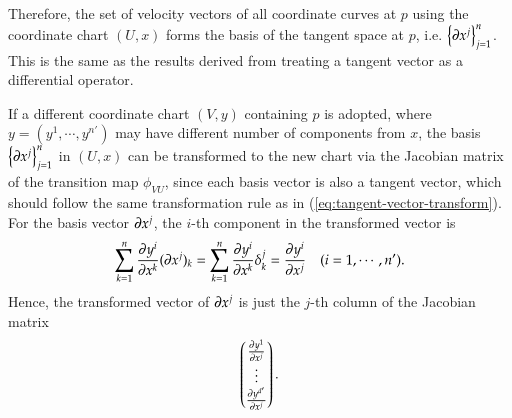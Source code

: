 \documentclass[11pt, a4paper]{book}
\begin{document}
Therefore, the set of velocity vectors of all coordinate curves at $p$ using the
coordinate chart $(U,x)$ forms the basis of the tangent space at $p$, i.e.
$\left\{ \boldsymbol{\partial} x^j \right\}_{j=1}^n$. This is the same as the results derived from
treating a tangent vector as a differential operator.

If a different coordinate chart $(V,y)$ containing $p$ is adopted, where
$y = (y^1,\cdots,y^{n'})$ may have different number of components from $x$, the basis
$\left\{ \boldsymbol{\partial}x^j \right\}_{j=1}^n$ in $(U,x)$ can be transformed to the new chart
via the Jacobian matrix of the transition map $\phi_{VU}$, since each basis vector is also a
tangent vector, which should follow the same transformation rule as in
(\ref{eq:tangent-vector-transform}). For the basis vector $\boldsymbol{\partial}x^j$, the $i$-th
component in the transformed vector is
\begin{equation}
  \label{eq:tangent-space-basis-transform}
  \sum_{k=1}^n \frac{\partial y^i}{\partial x^k} (\boldsymbol{\partial} x^j)_k = \sum_{k=1}^n
  \frac{\partial y^i}{\partial x^k} \delta_k^j = \frac{\partial y^{i}}{\partial x^{j}} \quad (i=1,\cdots,n').
\end{equation}
Hence, the transformed vector of $\boldsymbol{\partial}x^j$ is just the $j$-th column of the
Jacobian matrix
$$
\begin{pmatrix}
  \frac{\partial y^{1}}{\partial x^j} \\
  \vdots \\
  \frac{\partial y^{d'}}{\partial x^j}
\end{pmatrix}.
$$
\end{document}
